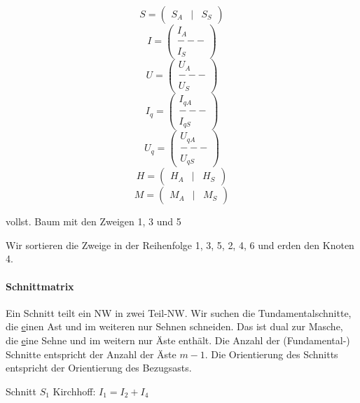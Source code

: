 \documentclass[german]{article}
\begin{document}
\[
	S = \begin{pmatrix}S_A & | & S_S\end{pmatrix}
\]
\[
	I = \begin{pmatrix}
		I_A \\
		--- \\
		I_S
	\end{pmatrix}
\]
\[
	U = \begin{pmatrix}
		U_A \\
		--- \\
		U_S
	\end{pmatrix}
\]
\[
	I_q = \begin{pmatrix}
		I_{qA} \\
		--- \\
		I_{qS}
	\end{pmatrix}
\]
\[
	U_q = \begin{pmatrix}
		U_{qA} \\
		--- \\
		U_{qS}
	\end{pmatrix}
\]
\[
	H = \begin{pmatrix}
		H_A & | & H_S
	\end{pmatrix}
\]
\[
	M = \begin{pmatrix}
		M_A & | & M_S
	\end{pmatrix}
\]


vollst. Baum mit den Zweigen 1, 3 und 5


Wir sortieren die Zweige in der Reihenfolge
{\color{red} 1, 3, 5, }{\color{blue} 2, 4, 6}
und erden den Knoten 4.

\paragraph{Schnittmatrix}
Ein Schnitt teilt ein NW in zwei Teil-NW. Wir suchen die Tundamentalschnitte, die {\underline einen} Ast und im weiteren nur Sehnen schneiden. Das ist dual zur Masche, die {\underline eine} Sehne und im weitern nur Äste enthält. Die Anzahl der (Fundamental-) Schnitte entspricht der Anzahl der Äste $m-1$. Die Orientierung des Schnitts entspricht der Orientierung des Bezugsasts.


Schnitt $S_1$
Kirchhoff: $I_1 = I_2 + I_4$
\end{document}
